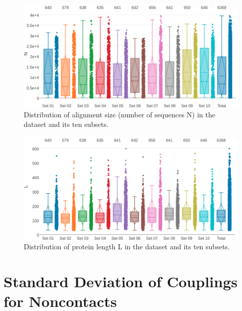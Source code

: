 \documentclass[11pt,a4paper,twoside]{book}
\theoremstyle{definition}
\theoremstyle{definition}
\theoremstyle{remark}
\begin{document}
\begin{figure}

{\centering \includegraphics[width=1\linewidth]{img/dataset_statistics/msa_size_dataset_boxplot_notitle} 

}

\caption{Distribution of alignment size (number of
sequences N) in the dataset and its ten subsets.}\label{fig:dataset-alignment-size}
\end{figure}




\begin{figure}

{\centering \includegraphics[width=1\linewidth]{img/dataset_statistics/protein_length_dataset_boxplot_notitle} 

}

\caption{Distribution of protein length L in the
dataset and its ten subsets.}\label{fig:dataset-protein-length}
\end{figure}

\chapter{Standard Deviation of Couplings for
Noncontacts}\label{standard-deviation-of-couplings-for-noncontacts}
\end{document}
